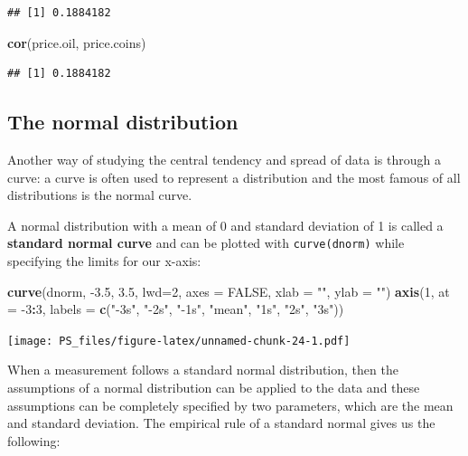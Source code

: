 \documentclass[]{article}
\newenvironment{Shaded}{\begin{snugshade}}{\end{snugshade}}
\newcommand{\DataTypeTok}[1]{\textcolor[rgb]{0.13,0.29,0.53}{#1}}
\newcommand{\DecValTok}[1]{\textcolor[rgb]{0.00,0.00,0.81}{#1}}
\newcommand{\FloatTok}[1]{\textcolor[rgb]{0.00,0.00,0.81}{#1}}
\newcommand{\KeywordTok}[1]{\textcolor[rgb]{0.13,0.29,0.53}{\textbf{#1}}}
\newcommand{\NormalTok}[1]{#1}
\newcommand{\OperatorTok}[1]{\textcolor[rgb]{0.81,0.36,0.00}{\textbf{#1}}}
\newcommand{\OtherTok}[1]{\textcolor[rgb]{0.56,0.35,0.01}{#1}}
\newcommand{\StringTok}[1]{\textcolor[rgb]{0.31,0.60,0.02}{#1}}
\begin{document}
\begin{verbatim}
## [1] 0.1884182
\end{verbatim}

\begin{Shaded}
\begin{Highlighting}[]
\KeywordTok{cor}\NormalTok{(price.oil, price.coins)}
\end{Highlighting}
\end{Shaded}

\begin{verbatim}
## [1] 0.1884182
\end{verbatim}

\hypertarget{the-normal-distribution}{%
\subsection{The normal distribution}\label{the-normal-distribution}}

Another way of studying the central tendency and spread of data is
through a curve: a curve is often used to represent a distribution and
the most famous of all distributions is the normal curve.

A normal distribution with a mean of 0 and standard deviation of 1 is
called a \textbf{standard normal curve} and can be plotted with
\texttt{curve(dnorm)} while specifying the limits for our x-axis:

\begin{Shaded}
\begin{Highlighting}[]
\KeywordTok{curve}\NormalTok{(dnorm, }\FloatTok{-3.5}\NormalTok{, }\FloatTok{3.5}\NormalTok{, }\DataTypeTok{lwd=}\DecValTok{2}\NormalTok{, }\DataTypeTok{axes =} \OtherTok{FALSE}\NormalTok{, }\DataTypeTok{xlab =} \StringTok{""}\NormalTok{, }\DataTypeTok{ylab =} \StringTok{""}\NormalTok{)}
\KeywordTok{axis}\NormalTok{(}\DecValTok{1}\NormalTok{, }\DataTypeTok{at =} \DecValTok{-3}\OperatorTok{:}\DecValTok{3}\NormalTok{, }\DataTypeTok{labels =} \KeywordTok{c}\NormalTok{(}\StringTok{"-3s"}\NormalTok{, }\StringTok{"-2s"}\NormalTok{, }\StringTok{"-1s"}\NormalTok{, }\StringTok{"mean"}\NormalTok{, }\StringTok{"1s"}\NormalTok{, }\StringTok{"2s"}\NormalTok{, }\StringTok{"3s"}\NormalTok{))}
\end{Highlighting}
\end{Shaded}

\texttt{[image: PS\_files/figure-latex/unnamed-chunk-24-1.pdf]}

When a measurement follows a standard normal distribution, then the
assumptions of a normal distribution can be applied to the data and
these assumptions can be completely specified by two parameters, which
are the mean and standard deviation. The empirical rule of a standard
normal gives us the following:
\end{document}
